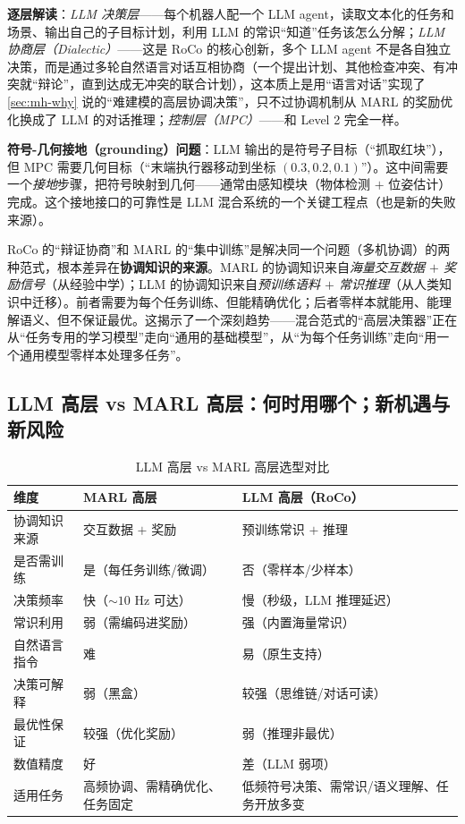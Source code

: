 \noindent\textbf{逐层解读}：\emph{LLM 决策层}——每个机器人配一个 LLM agent，读取文本化的任务和场景、输出自己的子目标计划，利用 LLM 的常识“知道”任务该怎么分解；\emph{LLM 协商层（Dialectic）}——这是 RoCo 的核心创新，多个 LLM agent 不是各自独立决策，而是通过多轮自然语言对话互相协商（一个提出计划、其他检查冲突、有冲突就“辩论”，直到达成无冲突的联合计划），这本质上是用“语言对话”实现了 \cref{sec:mh-why} 说的“难建模的高层协调决策”，只不过协调机制从 MARL 的奖励优化换成了 LLM 的对话推理；\emph{控制层（MPC）}——和 Level 2 完全一样。

\textbf{符号-几何接地（grounding）问题}：LLM 输出的是符号子目标（“抓取红块”），但 MPC 需要几何目标（“末端执行器移动到坐标 $(0.3,0.2,0.1)$”）。这中间需要一个\emph{接地}步骤，把符号映射到几何——通常由感知模块（物体检测 $+$ 位姿估计）完成。这个接地接口的可靠性是 LLM 混合系统的一个关键工程点（也是新的失败来源）。

\begin{insight}
RoCo 的“辩证协商”和 MARL 的“集中训练”是解决同一个问题（多机协调）的两种范式，根本差异在\textbf{协调知识的来源}。MARL 的协调知识来自\emph{海量交互数据 $+$ 奖励信号}（从经验中学）；LLM 的协调知识来自\emph{预训练语料 $+$ 常识推理}（从人类知识中迁移）。前者需要为每个任务训练、但能精确优化；后者零样本就能用、能理解语义、但不保证最优。这揭示了一个深刻趋势——混合范式的“高层决策器”正在从“任务专用的学习模型”走向“通用的基础模型”，从“为每个任务训练”走向“用一个通用模型零样本处理多任务”。
\end{insight}

\subsection{LLM 高层 vs MARL 高层：何时用哪个；新机遇与新风险}
\label{sec:mh-llm-vs-marl}

\begin{table}[H]\centering\small
\caption{LLM 高层 vs MARL 高层选型对比}
\label{tab:mh-llm-vs-marl}
\begin{tabular}{p{3.0cm}p{4.4cm}p{4.6cm}}
\toprule
维度 & MARL 高层 & LLM 高层（RoCo） \\
\midrule
协调知识来源 & 交互数据 $+$ 奖励 & 预训练常识 $+$ 推理 \\
是否需训练 & 是（每任务训练/微调） & 否（零样本/少样本） \\
决策频率 & 快（$\sim 10$ Hz 可达） & 慢（秒级，LLM 推理延迟） \\
常识利用 & 弱（需编码进奖励） & 强（内置海量常识） \\
自然语言指令 & 难 & 易（原生支持） \\
决策可解释 & 弱（黑盒） & 较强（思维链/对话可读） \\
最优性保证 & 较强（优化奖励） & 弱（推理非最优） \\
数值精度 & 好 & 差（LLM 弱项） \\
适用任务 & 高频协调、需精确优化、任务固定 & 低频符号决策、需常识/语义理解、任务开放多变 \\
\bottomrule
\end{tabular}
\end{table}

